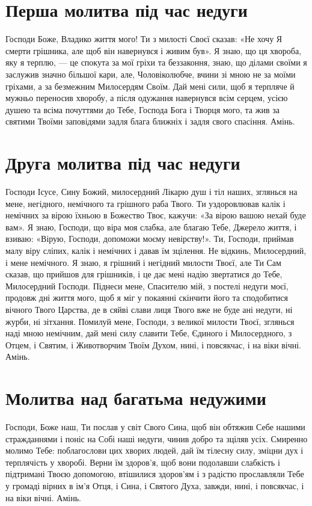\documentclass[chapters.tex]{subfiles}
\begin{document}
\section{Перша молитва під час недуги}
Господи Боже, Владико життя мого! Ти з милості Своєї сказав: «Не хочу Я смерти грішника, але щоб він навернувся і живим був». Я знаю, що ця хвороба, яку я терплю, — це спокута за мої гріхи та беззаконня, знаю, що ділами своїми я заслужив значно більшої кари, але, Чоловіколюбче, вчини зі мною не за моїми гріхами, а за безмежним Милосердям Своїм. Дай мені сили, щоб я терпляче й мужньо переносив хворобу, а після одужання навернувся всім серцем, усією душею та всіма почуттями до Тебе, Господа Бога і Творця мого, та жив за святими Твоїми заповідями задля блага ближніх і задля свого спасіння. Амінь.

\section{Друга молитва під час недуги}
Господи Ісусе, Сину Божий, милосердний Лікарю душ і тіл наших, зглянься на мене, негідного, немічного та грішного раба Твого. Ти уздоровлював калік і немічних за вірою їхньою в Божество Твоє, кажучи: «За вірою вашою нехай буде вам». Я знаю, Господи, що віра моя слабка, але благаю Тебе, Джерело життя, і взиваю: «Вірую, Господи, допоможи моєму невірству!». Ти, Господи, приймав малу віру сліпих, калік і немічних і давав їм зцілення. Не відкинь, Милосердний, і мене немічного. Я знаю, я грішний і негідний милости Твоєї, але Ти Сам сказав, що прийшов для грішників, і це дає мені надію звертатися до Тебе, Милосердний Господи. Піднеси мене, Спасителю мій, з постелі недуги моєї, продовж дні життя мого, щоб я міг у покаянні скінчити його та сподобитися вічного Твого Царства, де в сяйві слави лиця Твого вже не буде ані недуги, ні журби, ні зітхання. Помилуй мене, Господи, з великої милости Твоєї, зглянься наді мною немічним, дай мені силу славити Тебе, Єдиного і Милосердного, з Отцем, і Святим, і Животворчим Твоїм Духом, нині, і повсякчас, і на віки вічні. Амінь.

\section{Молитва над багатьма недужими}
Господи, Боже наш, Ти послав у світ Свого Сина, щоб він обтяжив Себе нашими стражданнями і поніс на Собі наші недуги, чинив добро та зціляв усіх. Смиренно молимо Тебе: поблагослови цих хворих людей, дай їм тілесну силу, зміцни дух і терплячість у хворобі. Верни їм здоров’я, щоб вони подолавши слабкість і підтримані Твоєю допомогою, втішилися здоров’ям і з радістю прославляли Тебе у громаді вірних в ім’я Отця, і Сина, і Святого Духа, завжди, нині, і повсякчас, і на віки вічні. Амінь.
\end{document}
